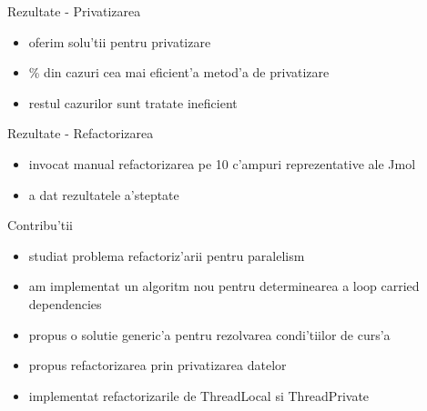 \documentclass{beamer}
\begin{document}
\begin{frame}{Rezultate - Privatizarea}
\Large
\begin{itemize}
  \item oferim solu'tii pentru privatizare
  \item {}\% din cazuri cea mai eficient'a metod'a de privatizare
  \item \pause restul cazurilor sunt tratate ineficient
\end{itemize}
\end{frame}

\begin{frame}{Rezultate - Refactorizarea}
\begin{itemize}
  \item invocat manual refactorizarea pe 10 c'ampuri reprezentative ale Jmol
  \item \pause a dat rezultatele a'steptate 
\end{itemize}
\end{frame}

\begin{frame}{Contribu'tii}
\begin{itemize}
  \item studiat problema refactoriz'arii pentru paralelism
  \item \pause am implementat un algoritm nou pentru determinearea a loop
  carried dependencies
  \item \pause propus o solutie generic'a pentru rezolvarea condi'tiilor de
  curs'a
  \item \pause propus refactorizarea prin privatizarea datelor
  \item \pause implementat refactorizarile de ThreadLocal si ThreadPrivate
   
  
\end{itemize}
\end{frame}
\end{document}
